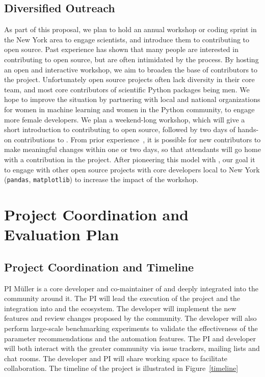 \subsection{Diversified Outreach}
As part of this proposal, we plan to hold an annual workshop or coding sprint
in the New York area to engage scientists, and introduce them to contributing
to open source. Past experience has shown that many people are interested
in contributing to open source, but are often intimidated by the process.
By hosting an open and interactive workshop, we aim to broaden the base
of contributors to the \sklearn{} project.
Unfortunately open source projects often lack diversity in their core team,
and most core contributors of scientific Python packages being men.
We hope to improve the situation by partnering with local and national
organizations for women in machine learning and women in the Python community,
to engage more female developers.
We plan a weekend-long workshop, which will give a short introduction to
contributing to open source, followed by two days of hands-on contributions to
\sklearn{}.
From prior experience~\autocite{meetupsprintSF}, it is possible for new
contributors to make meaningful changes within one or two days, so that
attendants will go home with a contribution in the project. After pioneering
this model with \sklearn{}, our goal it to engage with other open source
projects with core developers local to New York (\texttt{pandas},
\texttt{matplotlib}) to increase the impact of the workshop.

\section{Project Coordination and Evaluation Plan}
\subsection{Project Coordination and Timeline}
PI M\"uller is a core developer and co-maintainer of \sklearn{} and deeply integrated
into the community around it. The PI will lead the execution of the project and the integration
into \sklearn{} and the \sklearn{} ecosystem.
The developer will implement the new features and review changes proposed by
the \sklearn{} community. The developer will also perform large-scale
benchmarking experiments to validate the effectiveness of the parameter
recommendations and the automation features.  The PI and developer will both
interact with the greater community via issue trackers, mailing lists and
chat rooms. The developer and PI will share working space to facilitate
collaboration. The timeline of the project is illustrated in Figure~\ref{timeline}

